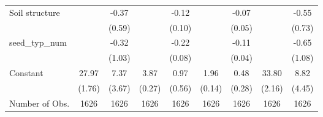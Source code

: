 {\begin{tabular}{l*{8}{c}}
Soil structure  &                  &    -0.37         &                  &    -0.12         &                  &    -0.07         &                  &    -0.55         \\
                &                  &   (0.59)         &                  &   (0.10)         &                  &   (0.05)         &                  &   (0.73)         \\
seed\_typ\_num    &                  &    -0.32         &                  &    -0.22\sym{***}&                  &    -0.11\sym{***}&                  &    -0.65         \\
                &                  &   (1.03)         &                  &   (0.08)         &                  &   (0.04)         &                  &   (1.08)         \\
Constant        &    27.97\sym{***}&     7.37\sym{**} &     3.87\sym{***}&     0.97\sym{*}  &     1.96\sym{***}&     0.48\sym{*}  &    33.80\sym{***}&     8.82\sym{**} \\
                &   (1.76)         &   (3.67)         &   (0.27)         &   (0.56)         &   (0.14)         &   (0.28)         &   (2.16)         &   (4.45)         \\
\hline
Number of Obs.  &     1626         &     1626         &     1626         &     1626         &     1626         &     1626         &     1626         &     1626         \\
\hline\hline
\end{tabular}
}
